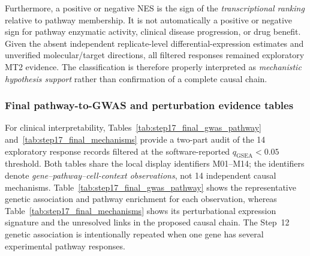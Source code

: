 \documentclass[11pt,a4paper]{article}
\begin{document}
Furthermore, a positive or negative NES is the sign of the \emph{transcriptional ranking} relative to pathway membership. It is not automatically a positive or negative sign for pathway enzymatic activity, clinical disease progression, or drug benefit. Given the absent independent replicate-level differential-expression estimates and unverified molecular/target directions, all filtered responses remained exploratory MT2 evidence. The classification is therefore properly interpreted as \emph{mechanistic hypothesis support} rather than confirmation of a complete causal chain.


\subsubsection{Final pathway-to-GWAS and perturbation evidence tables}
\label{subsec:step17_final_clinical_tables}

For clinical interpretability, Tables~\ref{tab:step17_final_gwas_pathway}
and~\ref{tab:step17_final_mechanisms} provide a two-part audit of the
14 exploratory response records filtered at the software-reported
$ q_{\mathrm{GSEA}}<0.05 $ threshold. Both tables share the local display
identifiers M01--M14; the identifiers denote \emph{gene--pathway--cell-context
observations}, not 14 independent causal mechanisms. Table~\ref{tab:step17_final_gwas_pathway}
shows the representative genetic association and pathway enrichment for
each observation, whereas Table~\ref{tab:step17_final_mechanisms} shows
its perturbational expression signature and the unresolved links in the
proposed causal chain. The Step~12 genetic association is intentionally
repeated when one gene has several experimental pathway responses.
\end{document}
